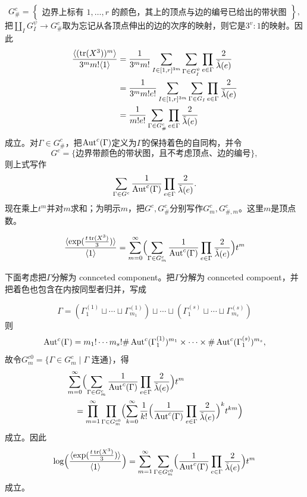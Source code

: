 \[
G_\#^c=\left\{\begin{array}{l}
\text{边界上标有 $1,\dots,r$ 的颜色，其上的顶点与边的编号已给出的带状图}
\end{array}\right\},
\]
把$\coprod_IG_I^\psi\to G_\#^c$取为忘记从各顶点伸出的边的次序的映射，则它是$3^v:1$的映射。因此
\[
\begin{aligned}
\frac{\langle(\operatorname{tr}(X^3))^m\rangle}{3^m m!\langle 1\rangle}
&=\frac{1}{3^m m!}\sum_{I\in[1,r]^{3m}}\sum_{\Gamma\in G_I^\psi}
\prod_{e\in\Gamma}\frac{2}{\tilde\lambda(e)}\\
&=\frac{1}{3^m m!e!}\sum_{I\in[1,r]^{3m}}\sum_{\Gamma\in G_I}
\prod_{e\in\Gamma}\frac{2}{\tilde\lambda(e)}\\
&=\frac{1}{m!e!}\sum_{\Gamma\in G_\#^c}\prod_{e\in\Gamma}\frac{2}{\tilde\lambda(e)}
\end{aligned}
\]
成立。对$\Gamma\in G_\#^c$，把$\operatorname{Aut}^c(\Gamma)$定义为$\Gamma$的保持着色的自同构，并令
\[
G^c=\{\text{边界带颜色的带状图，且不考虑顶点、边的编号}\},
\]
则上式写作
\[
\sum_{\Gamma\in G^c}\frac{1}{\operatorname{Aut}^c(\Gamma)}\prod_{e\in\Gamma}\frac{2}{\tilde\lambda(e)}.
\]
现在乘上$t^m$并对$m$求和；为明示$m$，把$G^c,G_\#^c$分别写作$G_m^c,G_{\#,m}^c$。这里$m$是顶点数。

\begin{theorem}
\[
\frac{\langle\exp(\frac{t\operatorname{tr}(X^3)}{3})\rangle}{\langle 1\rangle}
=\sum_{m=0}^{\infty}
\Bigl(\sum_{\Gamma\in G_m^c}\frac{1}{\operatorname{Aut}^c(\Gamma)}
\prod_{e\in\Gamma}\frac{2}{\tilde\lambda(e)}\Bigr)t^m
\]
\end{theorem}

下面考虑把$\Gamma$分解为 connceted component。把$\Gamma$分解为 connceted compoent，并把着色也包含在内按同型者归并，写成


\[
\Gamma=(\Gamma_1^{(1)}\sqcup\cdots\sqcup\Gamma_{m_1}^{(1)})
\sqcup\cdots\sqcup
(\Gamma_1^{(s)}\sqcup\cdots\sqcup\Gamma_{m_s}^{(s)})
\]
则
\[
\operatorname{Aut}^c(\Gamma)=m_1!\cdots m_s!
\#\operatorname{Aut}^c(\Gamma_1^{(1)})^{m_1}\times\cdots\times
\#\operatorname{Aut}^c(\Gamma_1^{(s)})^{m_s},
\]
故令$G_m^{c0}=\{\Gamma\in G_m^c\mid\Gamma\text{ 连通}\}$，得
\[
\begin{aligned}
&\sum_{m=0}^{\infty}\Bigl(\sum_{\Gamma\in G_m^c}\frac{1}{\operatorname{Aut}^c(\Gamma)}
\prod_{e\in\Gamma}\frac{2}{\tilde\lambda(e)}\Bigr)t^m\\
&\quad=\prod_{m=1}^{\infty}\prod_{\Gamma\in G_m^{c0}}
\Bigl(\sum_{k=0}^{\infty}\frac{1}{k!}
\Bigl(\frac{1}{\operatorname{Aut}^c(\Gamma)}\prod_{e\in\Gamma}\frac{2}{\tilde\lambda(e)}\Bigr)^k
t^{km}\Bigr)
\end{aligned}
\]
成立。因此
\[
\log\Bigl(\frac{\langle\exp(\frac{t\operatorname{tr}(X^3)}{3})\rangle}{\langle 1\rangle}\Bigr)
=\sum_{m=1}^{\infty}\sum_{\Gamma\in G_m^{c0}}
\Bigl(\frac{1}{\operatorname{Aut}^c(\Gamma)}\prod_{e\in\Gamma}\frac{2}{\tilde\lambda(e)}\Bigr)t^m
\]
成立。

